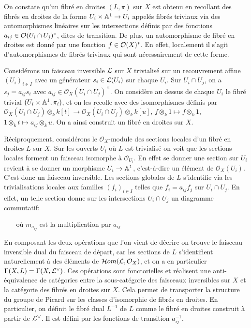 On constate qu'un fibré en droites $(L,\pi)$ sur $X$ est obtenu en recollant des fibrés en droites de la forme $U_i\times \mathbb{A}^1\rightarrow U_i$ appelés fibrés triviaux via des automorphismes linéaires sur les intersections définis par des fonctions $a_{ij}\in \mathcal{O}(U_i\cap U_j)^*$, dites de transition. De plus, un automorphisme de fibré en droites est donné par une fonction $f\in \mathcal{O}(X)^*$. En effet, localement il s'agit d'automorphismes de fibrés triviaux qui sont nécessairement de cette forme.

Considérons un faisceau inversible $\mathcal{L}$ sur $X$ trivialisé sur un recouvrement affine $(U_i)_{i\in I}$ avec un générateur $s_i\in\mathcal{L}(U_i)$ sur chaque $U_i$. Sur $U_i\cap U_j$, on a $s_j=a_{ij}s_i$ avec $a_{ij} \in \mathcal{O}_X(U_i\cap U_j)^\times$. On considère au dessus de chaque $U_i$ le fibré trivial $(U_i\times\mathbb{A}^1, \pi_i)$, et on les recolle avec des isomorphismes définis par $\mathcal{O}_X(U_i\cap U_j)\otimes_k k[t]\rightarrow \mathcal{O}_X(U_i\cap U_j)\otimes_k k[u]$, $f\otimes_k 1\mapsto f\otimes_k 1$, $1 \otimes_k t \mapsto a_{ij}\otimes_k u$. On a ainsi construit un fibré en droites sur $X$.

Réciproquement, considérons le $\mathcal{O}_X$-module des sections locales d'un fibré en droites $L$ sur $X$. Sur les ouverts $U_i$ où $L$ est trivialisé on voit que les sections locales forment un faisceau isomorphe à $\mathcal{O}_{U_i}$. En effet se donner une section sur $U_i$ revient à se donner un morphisme $U_i\rightarrow \mathbb{A}^1$, c'est-à-dire un élément de $\mathcal{O}_X(U_i)$. C'est donc un faisceau inversible. Les sections globales de $L$ s'identifie via les trivialisations locales aux familles $(f_i)_{i\in I}$ telles que $f_i=a_{ij}f_j$ sur $U_i\cap U_j$. En effet, un telle section donne sur les intersections $U_i\cap U_j$ un diagramme commutatif:

	\begin{center}
	$\,\,\,\,\,\,\,\,\,$ où $m_{a_{ij}}$ est la multiplication par $a_{ij}$ 
	\end{center}

En composant les deux opérations que l'on vient de décrire on trouve le faisceau inversible dual du faisceau de départ, car les sections de $L$ s'identifient naturellement à des éléments de $\mathcal{H} om(\mathcal{L},\mathcal{O}_X)$, et on a en particulier $\Gamma(X,L)=\Gamma(X,\mathcal{L}^\vee)$. Ces opérations sont fonctorielles et réalisent une anti-équivalence de catégories entre la sous-catégorie des faisceaux inversibles sur $X$ et la catégorie des fibrés en droites sur $X$. Cela permet de transporter la structure du groupe de Picard sur les classes d'isomorphie de fibrés en droites. En particulier, on définit le fibré dual $L^{-1}$ de $L$ comme le fibré en droites construit à partir de $\mathcal{L}^\vee$. Il est défini par les fonctions de transition $a_{ij}^{-1}$.

